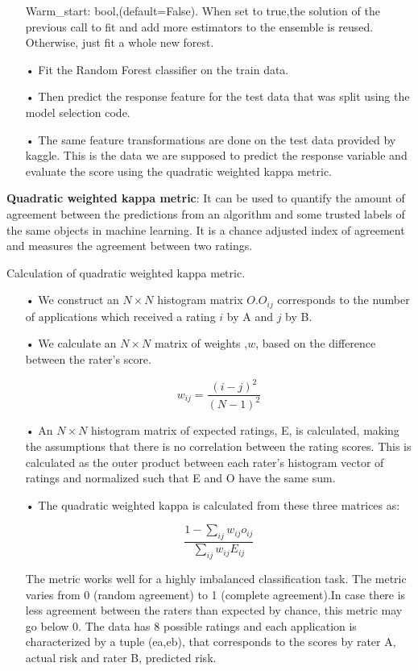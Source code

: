 \begin{enumerate}
Warm\_start: bool,(default=False). When set to true,the solution of the previous call to fit and add more estimators to the ensemble is reused. Otherwise, just fit a whole new forest.

\item[•] Fit the Random Forest classifier on the train data.

\item[•] Then predict the response feature for the test data that was split using the model selection code. 

\item[•] The same feature transformations are done on the test data provided by kaggle. This is the data we are supposed to predict the response variable and evaluate the score using the quadratic weighted kappa metric.
\end{enumerate}
 \textbf{Quadratic weighted kappa metric}: It can be used to quantify the amount of agreement between the predictions from an algorithm and some trusted labels of the same objects in machine learning. It is a chance adjusted index of agreement and measures the agreement between two ratings.

Calculation of quadratic weighted kappa metric.
\begin{enumerate}
\item[•] We construct an $N\times N$ histogram matrix $O$.$O_{ij}$ corresponds to the number of applications which received a rating $i$ by A and $j$ by B.

\item[•] We calculate an $N\times N$ matrix of weights ,$w$, based on the difference between the rater's score.

\begin{equation}
w_{ij}=\dfrac{(i-j)^2}{(N-1)^2}
\end{equation}

\item[•] An $N\times N$ histogram matrix of expected ratings, E, is calculated, making the assumptions that there is no correlation between the rating scores. This is calculated as the outer product between each rater's histogram vector of ratings and normalized such that E and O have the same sum.

\item[•] The quadratic weighted kappa is calculated from these three matrices as:

\begin{equation}
\dfrac{1-\sum_{ij}w_{ij}o_{ij}}{\sum_{ij}w_{ij}E_{ij}}
\end{equation}

The metric works well for a highly imbalanced classification task. The metric varies from 0 (random agreement) to 1 (complete agreement).In case there is less agreement between the raters than expected by chance, this metric may go below 0. The data has 8 possible ratings and each application is characterized by a tuple (ea,eb), that corresponds to the scores by rater A, actual risk and rater B, predicted risk. 
\end{enumerate}

